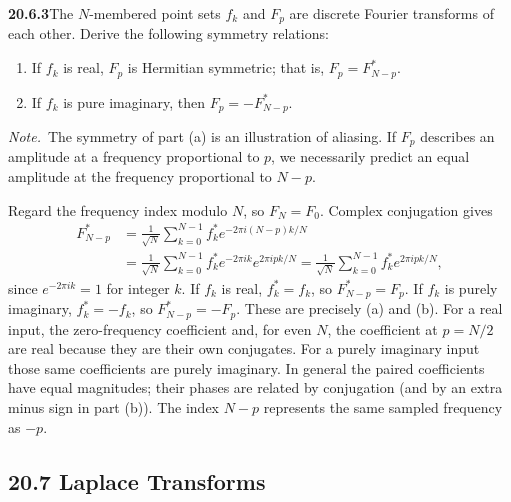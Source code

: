 \par\bigskip
\noindent\textbf{20.6.3}\quad The $N$-membered point sets $f_{k}$
and $F_{p}$ are discrete Fourier transforms of each other. Derive
the following symmetry relations:
\begin{enumerate}
\item[(a)] If $f_{k}$ is real, $F_{p}$ is Hermitian symmetric;
that is, $F_{p}=F_{N-p}^{*}$.
\item[(b)] If $f_{k}$ is pure imaginary, then
$F_{p}=-F_{N-p}^{*}$.
\end{enumerate}
\par\emph{Note.}~The symmetry of part (a) is an illustration of
aliasing. If $F_{p}$ describes an amplitude at a frequency
proportional to $p$, we necessarily predict an equal amplitude at
the frequency proportional to $N-p$.
\par{}
\solution
Regard the frequency index modulo $N$, so $F_N=F_0$.
Complex conjugation gives
\begin{align*}
F_{N-p}^{*}
&=\frac1{\sqrt N}\sum_{k=0}^{N-1}f_k^*
 e^{-2\pi i(N-p)k/N}\\
&=\frac1{\sqrt N}\sum_{k=0}^{N-1}f_k^*
 e^{-2\pi ik}e^{2\pi ipk/N}
=\frac1{\sqrt N}\sum_{k=0}^{N-1}f_k^*e^{2\pi ipk/N},
\end{align*}
since $e^{-2\pi ik}=1$ for integer $k$.
If $f_k$ is real, $f_k^*=f_k$, so $F_{N-p}^*=F_p$.
If $f_k$ is purely imaginary, $f_k^*=-f_k$, so
$F_{N-p}^*=-F_p$. These are precisely (a) and (b).
For a real input, the zero-frequency coefficient and, for even
$N$, the coefficient at $p=N/2$ are real because they are their
own conjugates. For a purely imaginary input those same
coefficients are purely imaginary. In general the paired
coefficients have equal magnitudes; their phases are related
by conjugation (and by an extra minus sign in part (b)). The
index $N-p$ represents the same sampled frequency as $-p$.

\subsection*{20.7 Laplace Transforms}

